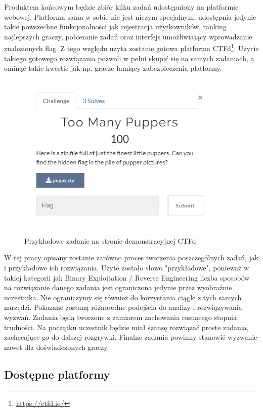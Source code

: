 \documentclass[polish,12pt]{aghthesis}
\begin{document}
Produktem końcowym będzie zbiór kilku zadań udostępniony na platformie webowej.
Platforma sama w sobie nie jest niczym specjalnym, udostępnia jedynie takie powszechne
funkcjonalności jak rejestracja użytkowników, ranking najlepszych graczy,
pobieranie zadań oraz interfejs umożliwiający wprowadzanie znalezionych
flag. Z tego względu użyta zostanie gotowa platforma CTFd\footnote{\url{https://ctfd.io/}}.
Użycie takiego gotowego rozwiązania pozwoli w pełni skupić się na samych zadaniach,
a ominąć takie kwestie jak np. gracze łamiący zabezpieczenia platformy.

\begin{figure}[ht]
    \centering
    \includegraphics[width=10cm]{ctfd}
    \caption{Przykładowe zadanie na stronie demonstracyjnej CTFd}
    \label{fig:ctfd}
\end{figure}

W tej pracy opisany zostanie zarówno proces tworzenia poszczególnych zadań,
jak i przykładowe ich rozwiązania. Użyte zostało słowo "przykładowe", ponieważ
w takiej kategorii jak Binary Exploitation / Reverse Engineering liczba sposobów
na rozwiązanie danego zadania jest ograniczona jedynie przez wyobraźnie uczestnika.
Nie ograniczymy się również do korzystania ciągle z tych samych narzędzi.
Pokazane zostaną różnorodne podejścia do analizy i rozwiązywania wyzwań.
Zadania będą tworzone z zamiarem zachowania rosnącego stopnia trudności.
Na początku uczestnik będzie miał szansę rozwiązać proste zadania,
zachęcające go do dalszej rozgrywki. Finalne zadania powinny stanowić wyzwanie
nawet dla doświadczonych graczy. \pagebreak

\subsection{Dostępne platformy}
\end{document}
